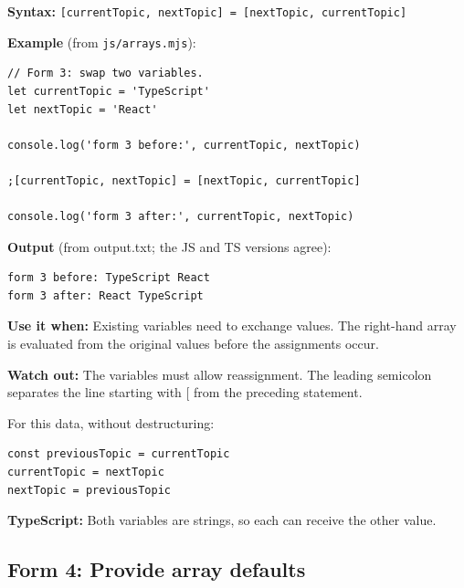 \documentclass[10pt,a4paper]{article}
\begin{document}
\textbf{Syntax:} \texttt{[current\allowbreak{}Topic,\allowbreak{} next\allowbreak{}Topic] =\allowbreak{} [next\allowbreak{}Topic,\allowbreak{} current\allowbreak{}Topic]}


\textbf{Example} (from \texttt{js/\allowbreak{}arrays.\allowbreak{}mjs}):

\begin{lstlisting}[language=GuideJS]
// Form 3: swap two variables.
let currentTopic = 'TypeScript'
let nextTopic = 'React'

console.log('form 3 before:', currentTopic, nextTopic)

;[currentTopic, nextTopic] = [nextTopic, currentTopic]

console.log('form 3 after:', currentTopic, nextTopic)
\end{lstlisting}


\textbf{Output} (from output.txt; the JS and TS versions agree):

\begin{lstlisting}[language={}]
form 3 before: TypeScript React
form 3 after: React TypeScript
\end{lstlisting}

\textbf{Use it when:} Existing variables need to exchange values. The right-hand array is evaluated from the original values before the assignments occur.

\textbf{Watch out:} The variables must allow reassignment. The leading semicolon separates the line starting with [ from the preceding statement.


For this data, without destructuring:

\begin{lstlisting}[language=GuideJS]
const previousTopic = currentTopic
currentTopic = nextTopic
nextTopic = previousTopic
\end{lstlisting}

\textbf{TypeScript:} Both variables are strings, so each can receive the other value.

\subsection{Form 4: Provide array defaults}
\end{document}
